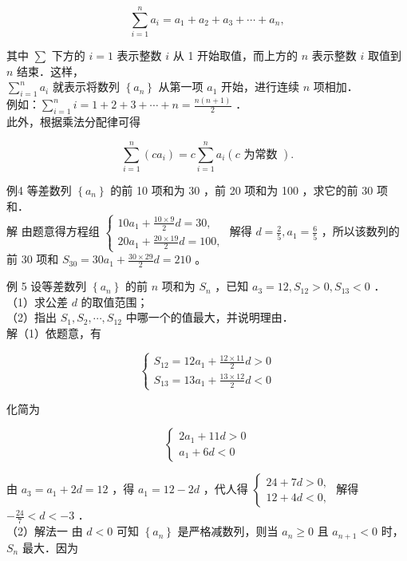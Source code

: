\documentclass[10pt]{article}
\begin{document}
\[
\sum_{i=1}^{n} a_{i}=a_{1}+a_{2}+a_{3}+\cdots+a_{n},
\]

其中 \(\sum\) 下方的 \(i=1\) 表示整数 \(i\) 从 1 开始取值，而上方的 \(n\) 表示整数 \(i\) 取值到 \(n\) 结束．这样，\\
\(\sum_{i=1}^{n} a_{i}\) 就表示将数列 \(\left\{a_{n}\right\}\) 从第一项 \(a_{1}\) 开始，进行连续 \(n\) 项相加．\\
例如：\(\sum_{i=1}^{n} i=1+2+3+\cdots+n=\frac{n(n+1)}{2}\) ．\\
此外，根据乘法分配律可得

\[
\sum_{i=1}^{n}\left(c a_{i}\right)=c \sum_{i=1}^{n} a_{i}(c \text { 为常数 }) .
\]

例4 等差数列 \(\left\{a_{n}\right\}\) 的前 10 项和为 30 ，前 20 项和为 100 ，求它的前 30 项和．\\
解 由题意得方程组 \(\left\{\begin{array}{l}10 a_{1}+\frac{10 \times 9}{2} d=30, \\ 20 a_{1}+\frac{20 \times 19}{2} d=100,\end{array}\right.\) 解得 \(d=\frac{2}{5}, a_{1}=\frac{6}{5}\) ，所以该数列的前 30 项和 \(S_{30}=30 a_{1}+\frac{30 \times 29}{2} d=210\) 。

例 5 设等差数列 \(\left\{a_{n}\right\}\) 的前 \(n\) 项和为 \(S_{n}\) ，已知 \(a_{3}=12, S_{12}>0, S_{13}<0\) ．\\
（1）求公差 \(d\) 的取值范围；\\
（2）指出 \(S_{1}, S_{2}, \cdots, S_{12}\) 中哪一个的值最大，并说明理由．\\
解（1）依题意，有

\[
\left\{\begin{array}{l}
S_{12}=12 a_{1}+\frac{12 \times 11}{2} d>0 \\
S_{13}=13 a_{1}+\frac{13 \times 12}{2} d<0
\end{array}\right.
\]

化简为

\[
\left\{\begin{array}{l}
2 a_{1}+11 d>0 \\
a_{1}+6 d<0
\end{array}\right.
\]

由 \(a_{3}=a_{1}+2 d=12\) ，得 \(a_{1}=12-2 d\) ，代人得 \(\left\{\begin{array}{l}24+7 d>0, \\ 12+4 d<0,\end{array}\right.\) 解得 \(-\frac{24}{7}<d<-3\) ．\\
（2）解法一 由 \(d<0\) 可知 \(\left\{a_{n}\right\}\) 是严格减数列，则当 \(a_{n} \geqslant 0\) 且 \(a_{n+1}<0\) 时，\(S_{n}\) 最大．因为
\end{document}
